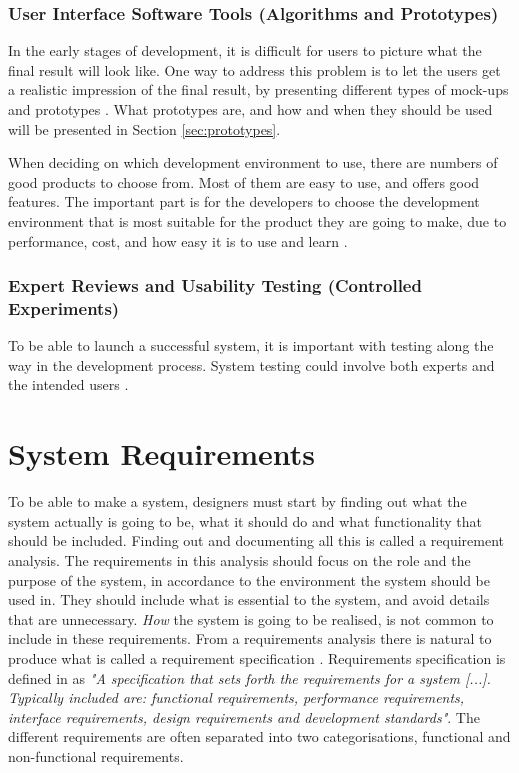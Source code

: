 \subsubsection{User Interface Software Tools (Algorithms and Prototypes)}
In the early stages of development, it is difficult for users to picture what the final result will look like. One way to address this problem is to let the users get a realistic impression of the final result, by presenting different types of mock-ups and prototypes \cite{mmi}. What prototypes are, and how and when they should be used will be presented in Section \ref{sec:prototypes}. 

When deciding on which development environment to use, there are numbers of good products to choose from. Most of them are easy to use, and offers good features. The important part is for the developers to choose the development environment that is most suitable for the product they are going to make, due to performance, cost, and how easy it is to use and learn \cite{mmi}.
	
\subsubsection{Expert Reviews and Usability Testing (Controlled Experiments)}
To be able to launch a successful system, it is important with testing along the way in the development process. System testing could involve both experts and the intended users \cite{mmi}. 

\section{System Requirements}
\label{sec:systemreq}
To be able to make a system, designers must start by finding out what the system actually is going to be, what it should do and what functionality that should be included. Finding out and documenting all this is called a requirement analysis. The requirements in this analysis should focus on the role and the purpose of the system, in accordance to the environment the system should be used in. They should include what is essential to the system, and avoid details that are unnecessary. \emph{How} the system is going to be realised, is not common to include in these requirements. From a requirements analysis there is natural to produce what is called a requirement specification \cite{braude2000software}. Requirements specification is defined in \cite{systemutviklingDel1} as \emph{"A specification that sets forth the requirements for a system [...]. Typically included are: functional requirements, performance requirements, interface requirements, design requirements and development standards"}. The different requirements are often separated into two categorisations, functional and non-functional requirements. 

